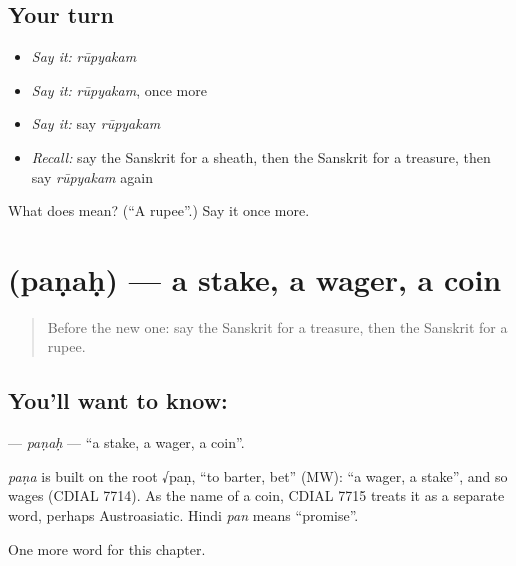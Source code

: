 \subsection*{Your turn}
\begin{itemize}
\raggedright
  \item \emph{Say it:} \emph{rūpyakam}
  \item \emph{Say it:} \emph{rūpyakam}, once more
  \item \emph{Say it:} say \emph{rūpyakam}
  \item \emph{Recall:} say the Sanskrit for a sheath, then the Sanskrit for a treasure, then say \emph{rūpyakam} again
\end{itemize}

\begin{tcolorbox}[breakable,colback=teal!4,colframe=teal!35!black,title={Before you move on}]
What does  mean? (\textquotedblleft{}A rupee\textquotedblright{}.) Say it once more.
\end{tcolorbox}
\section[\texorpdfstring{\sk{पणः} (paṇaḥ)}{पणः (paṇaḥ)}]{ (paṇaḥ) — a stake, a wager, a coin}

\label{lesson:SA-C248-panah}



\begin{quote}
Before the new one: say the Sanskrit for a treasure, then the Sanskrit for a rupee.
\end{quote}

\subsection*{You'll want to know: }
\textbf{} — \emph{paṇaḥ} — \textquotedblleft{}a stake, a wager, a coin\textquotedblright{}.

\begin{cousinweb}
\emph{paṇa} is built on the root √paṇ, \textquotedblleft{}to barter, bet\textquotedblright{} (MW): \textquotedblleft{}a wager, a stake\textquotedblright{}, and so wages (CDIAL 7714). As the name of a coin, CDIAL 7715 treats it as a separate word, perhaps Austroasiatic. Hindi \emph{pan} means \textquotedblleft{}promise\textquotedblright{}.
\end{cousinweb}

\begin{grammarlens}[title={What you've built}]
One more word for this chapter.
\end{grammarlens}

